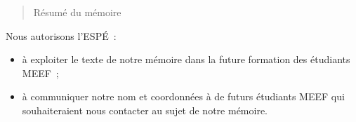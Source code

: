 \begin{abstract}
Résumé du mémoire
\end{abstract}

Nous autorisons l'ESPÉ :
\begin{itemize}
\item à exploiter le texte de notre mémoire dans la future formation des étudiants MEEF ;
\item à communiquer notre nom et coordonnées à de futurs étudiants MEEF qui souhaiteraient
nous contacter au sujet de notre mémoire.
\end{itemize}
